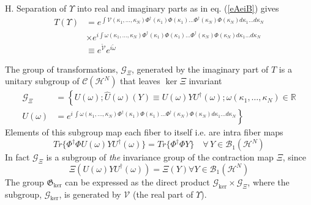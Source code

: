 \documentclass[aps,preprint]{revtex4}%
\begin{document}
H. Separation of $\Upsilon$ into real and imaginary parts as in eq.
(\ref{eAeiB}) gives
\begin{align}
T(\Upsilon)  &  =e^{\int\mathcal{V}(\kappa_{1},\ldots,\kappa_{N})\Phi
^{\dagger}(\kappa_{1})\Phi(\kappa_{1})\ldots\Phi^{\dagger}(\kappa_{N}%
)\Phi(\kappa_{N})d\kappa_{1}\ldots d\kappa_{N}}\nonumber\\
&  \times e^{i\int\omega(\kappa_{1},\ldots,\kappa_{N})\Phi^{\dagger}%
(\kappa_{1})\Phi(\kappa_{1})\ldots\Phi^{\dagger}(\kappa_{N})\Phi(\kappa
_{N})d\kappa_{1}\ldots d\kappa_{N}}\nonumber\\
&  \equiv e^{\breve{\mathcal{V}}}e^{i\breve{\omega}} \label{TVomega}%
\end{align}


The group of transformations, $\mathcal{G}_{\Xi}$, generated by the imaginary
part of $T$ is a unitary subgroup of $\mathcal{C}(\mathcal{H}^{N})$ that
leaves $\ker\Xi$ invariant
\begin{align}
\!\mathcal{G}_{\Xi}  &  =\left\{  U(\omega);\hat{U}(\omega)(Y)\equiv
U(\omega)YU^{\dagger}(\omega);\right.  \omega(\kappa_{1},\ldots,\kappa_{N}%
)\in\mathbb{R}\nonumber\\
U(\omega)  &  =\left.  e^{i\,\int\omega(\kappa_{1},\ldots,\kappa_{N}%
)\Phi^{\dagger}(\kappa_{1})\Phi(\kappa_{1})\ldots\Phi^{\dagger}(\kappa
_{N})\Phi(\kappa_{N})d\kappa_{1}\ldots d\kappa_{N}}\right\}  \label{GXidefn1}%
\end{align}
Elements of this subgroup map each fiber to itself i.e. are intra fiber maps
\begin{equation}
Tr\{\Phi^{\dagger}\Phi U(\omega)YU^{\dagger}(\omega)\}=Tr\{\Phi^{\dagger}\Phi
Y\}\quad\forall\,Y\in\mathcal{B}_{1}(\mathcal{H}^{N})
\end{equation}
In fact $\mathcal{G}_{\Xi}$ is a subgroup of \emph{the} invariance group of
the contraction map $\Xi$, since
\begin{equation}
\Xi\left(  U(\omega)YU^{\dagger}(\omega)\right)  =\Xi\left(  Y\right)  \text{
}\forall Y\in\mathcal{B}_{1}\left(  \mathcal{H}^{N}\right)
\end{equation}
The group $\mathfrak{G}_{\ker}$ can be expressed as the direct product
$\mathcal{G}_{\ker}\times\mathcal{G}_{\Xi}$, where the subgroup,
$\mathcal{G}_{\ker}$, is generated by $\mathcal{V}$ (the real part of
$\Upsilon$).
\end{document}
